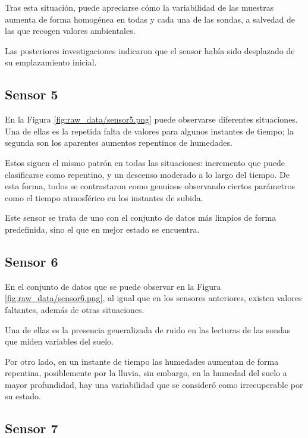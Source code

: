 Tras esta situación, puede apreciarse cómo la variabilidad de las muestras
aumenta de forma homogénea en todas y cada una de las sondas, a salvedad de las que recogen
valores ambientales.

Las posteriores investigaciones indicaron que el sensor había sido desplazado
de su emplazamiento inicial.

\newpage
\subsection{Sensor 5}


En la Figura \ref{fig:raw_data/sensor5.png} puede observarse diferentes situaciones.
Una de ellas es la repetida falta de valores para algunos instantes de tiempo; la 
segunda son los aparentes aumentos repentinos de humedades.

Estos siguen el mismo patrón en todas las situaciones: incremento que puede clasificarse
como repentino, y un descenso moderado a lo largo del tiempo.
De esta forma, todos se contrastaron como genuinos observando ciertos parámetros como
el tiempo atmosférico en los instantes de subida.

Este sensor se trata de uno con el conjunto de datos más limpios de forma predefinida, 
sino el que en mejor estado se encuentra.

\newpage
\subsection{Sensor 6}


En el conjunto de datos que se puede observar en la Figura \ref{fig:raw_data/sensor6.png},
al igual que en los sensores anteriores, existen valores faltantes, además de 
otras situaciones.

Una de ellas es la presencia generalizada de ruido en las lecturas
de las sondas que miden variables del suelo.

Por otro lado, en un instante de tiempo las humedades aumentan de forma repentina, posiblemente
por la lluvia, sin embargo, en la humedad del suelo a mayor profundidad, hay una variabilidad
que se consideró como irrecuperable por su estado.

\newpage
\subsection{Sensor 7}

